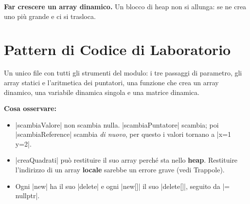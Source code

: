 \textbf{Far crescere un array dinamico.} Un blocco di heap non si allunga: se ne
crea uno più grande e ci si trasloca.
\begin{center}
\end{center}

\section{Pattern di Codice di Laboratorio}

Un unico file con tutti gli strumenti del modulo: i tre passaggi di parametro,
gli array statici e l'aritmetica dei puntatori, una funzione che crea un array
dinamico, una variabile dinamica singola e una matrice dinamica.


\textbf{Cosa osservare:}
\begin{itemize}
  \item \cc|scambiaValore| non scambia nulla. \cc|scambiaPuntatore| scambia;
        poi \cc|scambiaReference| scambia \emph{di nuovo}, per questo i valori
        tornano a \cc|x=1 y=2|.
  \item \cc|creaQuadrati| può restituire il suo array perché sta nello
        \textbf{heap}. Restituire l'indirizzo di un array \textbf{locale} sarebbe
        un errore grave (vedi Trappole).
  \item Ogni \cc|new| ha il suo \cc|delete| e ogni \cc|new[]| il suo
        \cc|delete[]|, seguito da \cc|= nullptr|.
\end{itemize}

